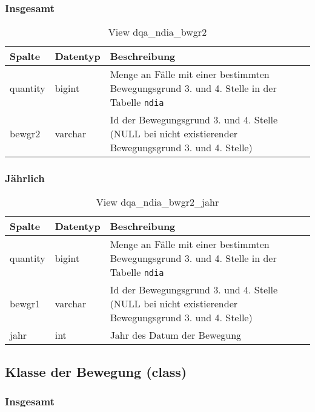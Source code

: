 \subsubsection{Insgesamt} \label{subsubsec:bewg2I}

\begin{table}[ht]
	\centering   
	\caption{View dqa\_ndia\_bwgr2}
	\label{tab:bewG2I}
	\begin{tabular}{||l|l|p{10cm}||}   		
		\hline
		Spalte & Datentyp & Beschreibung \\ [0.5ex]
		\hline\hline
		quantity & bigint & Menge an Fälle mit einer bestimmten Bewegungsgrund 3. und 4. Stelle in der Tabelle \texttt{ndia} \\
		\hline
		bewgr2 & varchar & Id der Bewegungsgrund 3. und 4. Stelle (NULL bei nicht existierender Bewegungsgrund 3. und 4. Stelle)\\
		\hline
		
	\end{tabular}
\end{table}

\newpage

\subsubsection{Jährlich} \label{subsubsec:bewg2J}

\begin{table}[ht]
	\centering   
	\caption{View dqa\_ndia\_bwgr2\_jahr}
	\label{tab:bewG2J}
	\begin{tabular}{||l|l|p{10cm}||}   		
		\hline
		Spalte & Datentyp & Beschreibung \\ [0.5ex]
		\hline\hline
		quantity & bigint & Menge an Fälle mit einer bestimmten Bewegungsgrund 3. und 4. Stelle in der Tabelle \texttt{ndia}\\
		\hline
		bewgr1 & varchar & Id der Bewegungsgrund 3. und 4. Stelle (NULL bei nicht existierender Bewegungsgrund 3. und 4. Stelle)\\
		\hline
		jahr & int &  Jahr des Datum der Bewegung \\
		\hline		
	\end{tabular}
\end{table}

\subsection{Klasse der Bewegung (class)} \label{subsec:bewclass}

\subsubsection{Insgesamt} \label{subsubsec:bewClassI}

